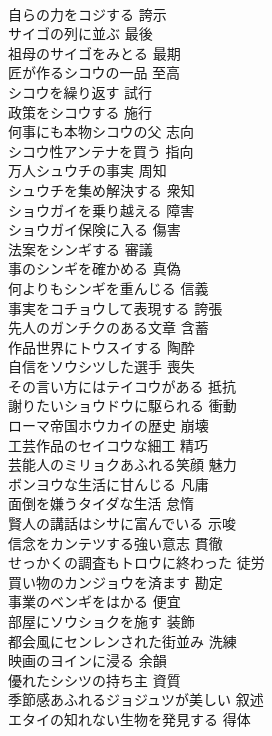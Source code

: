 \documentclass[8pt]{extreport}
\begin{document}
\begin{CJK}{UTF8}{min}
\\	自らの力をコジする	誇示
\\	サイゴの列に並ぶ	最後
\\	祖母のサイゴをみとる	最期
\\	匠が作るシコウの一品	至高
\\	シコウを繰り返す	試行
\\	政策をシコウする	施行
\\	何事にも本物シコウの父	志向
\\	シコウ性アンテナを買う	指向
\\	万人シュウチの事実	周知
\\	シュウチを集め解決する	衆知
\\	ショウガイを乗り越える	障害
\\	ショウガイ保険に入る	傷害
\\	法案をシンギする	審議
\\	事のシンギを確かめる	真偽
\\	何よりもシンギを重んじる	信義
\\	事実をコチョウして表現する	誇張
\\	先人のガンチクのある文章	含蓄
\\	作品世界にトウスイする	陶酔
\\	自信をソウシツした選手	喪失
\\	その言い方にはテイコウがある	抵抗
\\	謝りたいショウドウに駆られる	衝動
\\	ローマ帝国ホウカイの歴史	崩壊
\\	工芸作品のセイコウな細工	精巧
\\	芸能人のミリョクあふれる笑顔	魅力
\\	ボンヨウな生活に甘んじる	凡庸
\\	面倒を嫌うタイダな生活	怠惰
\\	賢人の講話はシサに富んでいる	示唆
\\	信念をカンテツする強い意志	貫徹
\\	せっかくの調査もトロウに終わった	徒労
\\	買い物のカンジョウを済ます	勘定
\\	事業のベンギをはかる	便宜
\\	部屋にソウショクを施す	装飾
\\	都会風にセンレンされた街並み	洗練
\\	映画のヨインに浸る	余韻
\\	優れたシシツの持ち主	資質
\\	季節感あふれるジョジュツが美しい	叙述
\\	エタイの知れない生物を発見する	得体

\end{CJK}
\end{document}
